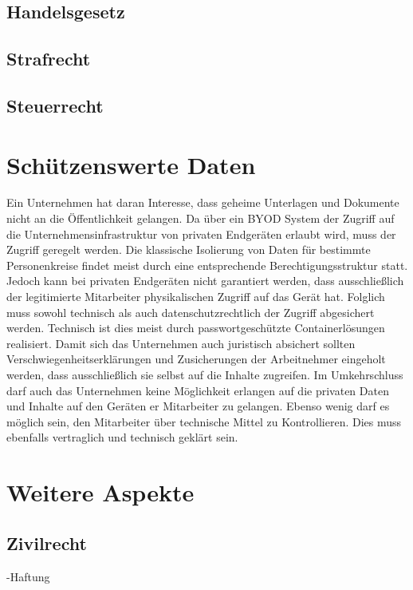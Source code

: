 \subsection{Handelsgesetz}
\subsection{Strafrecht}
\subsection{Steuerrecht}
\section {Schützenswerte Daten}

Ein Unternehmen hat daran Interesse, dass geheime Unterlagen und Dokumente nicht an die Öffentlichkeit gelangen. Da über ein BYOD System der Zugriff auf die Unternehmensinfrastruktur von privaten Endgeräten erlaubt wird, muss der Zugriff geregelt werden. 
Die klassische Isolierung von Daten für bestimmte Personenkreise findet meist durch eine entsprechende Berechtigungsstruktur statt.  Jedoch kann bei privaten Endgeräten nicht garantiert werden, dass ausschließlich der legitimierte Mitarbeiter physikalischen Zugriff auf das Gerät hat. Folglich muss sowohl technisch als auch datenschutzrechtlich der Zugriff abgesichert werden. Technisch ist dies meist durch passwortgeschützte Containerlösungen realisiert. Damit sich das Unternehmen auch  juristisch absichert sollten Verschwiegenheitserklärungen und Zusicherungen der Arbeitnehmer eingeholt werden, dass ausschließlich  sie selbst auf die Inhalte zugreifen. Im Umkehrschluss darf auch das Unternehmen keine Möglichkeit erlangen auf die privaten Daten und Inhalte auf den Geräten er Mitarbeiter zu gelangen.  Ebenso wenig darf es möglich sein, den Mitarbeiter über technische Mittel zu Kontrollieren. Dies muss ebenfalls vertraglich und technisch geklärt sein. 

\section {Weitere Aspekte}

\subsection{Zivilrecht}

 -Haftung











